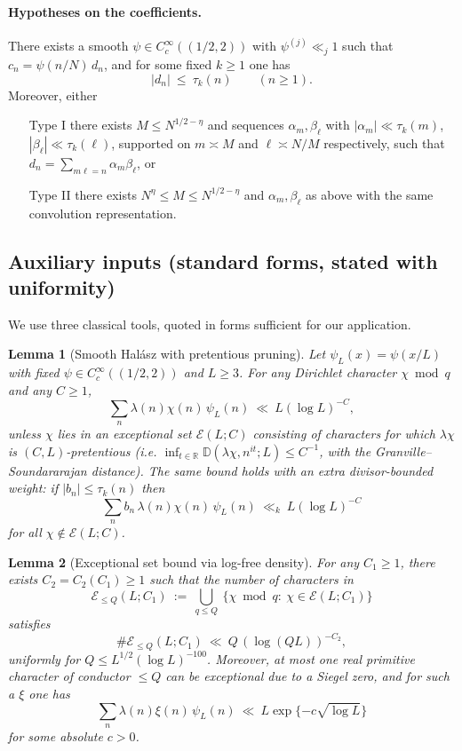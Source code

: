 \documentclass[11pt]{article}
\newtheorem{lemma}{Lemma}[section]
\theoremstyle{definition}
\theoremstyle{remark}
\begin{document}
\paragraph{Hypotheses on the coefficients.}
There exists a smooth $\psi\in C_c^\infty((1/2,2))$ with $\psi^{(j)}\ll_j 1$ such that $c_n=\psi(n/N)\,d_n$, and for some fixed $k\ge 1$ one has
\[
|d_n|\ \le\ \tau_k(n)\qquad (n\ge 1).
\]
Moreover, either
\begin{itemize}[leftmargin=2em]
\item[\textup{Type I}] there exists $M\le N^{1/2-\eta}$ and sequences $\alpha_m,\beta_\ell$ with $|\alpha_m|\ll\tau_k(m)$, $|\beta_\ell|\ll\tau_k(\ell)$, supported on $m\asymp M$ and $\ell\asymp N/M$ respectively, such that $d_n=\sum_{m\ell=n}\alpha_m\beta_\ell$, or
\item[\textup{Type II}] there exists $N^{\eta}\le M\le N^{1/2-\eta}$ and $\alpha_m,\beta_\ell$ as above with the same convolution representation.
\end{itemize}

\subsection*{Auxiliary inputs (standard forms, stated with uniformity)}
We use three classical tools, quoted in forms sufficient for our application.

\begin{lemma}[Smooth Halász with pretentious pruning]\label{lem:halasz}
Let $\psi_L(x)=\psi(x/L)$ with fixed $\psi\in C_c^\infty((1/2,2))$ and $L\ge 3$. For any Dirichlet character $\chi\bmod q$ and any $C\ge 1$,
\[
\sum_{n}\lambda(n)\chi(n)\,\psi_L(n)\ \ll\ L(\log L)^{-C},
\]
\emph{unless} $\chi$ lies in an exceptional set $\mathcal E(L;C)$ consisting of characters for which $\lambda\chi$ is $(C,\!L)$-pretentious (i.e. $\inf_{t\in\mathbb R}\mathbb D(\lambda\chi,n^{it};L)\le C^{-1}$, with the Granville–Soundararajan distance). The same bound holds with an extra divisor-bounded weight: if $|b_n|\le \tau_k(n)$ then
\[
\sum_{n} b_n\,\lambda(n)\chi(n)\,\psi_L(n)\ \ll_{k}\ L(\log L)^{-C}
\]
for all $\chi\notin\mathcal E(L;C)$.
\end{lemma}

\begin{lemma}[Exceptional set bound via log-free density]\label{lem:density}
For any $C_1\ge 1$, there exists $C_2=C_2(C_1)\ge 1$ such that the number of characters in
\[
\mathcal E_{\le Q}(L;C_1)\ :=\ \bigcup_{q\le Q}\ \{\chi\bmod q:\ \chi\in\mathcal E(L;C_1)\}
\]
satisfies
\[
\#\mathcal E_{\le Q}(L;C_1)\ \ll\ Q\,(\log (QL))^{-C_2},
\]
uniformly for $Q\le L^{1/2}(\log L)^{-100}$.
Moreover, at most one real primitive character of conductor $\le Q$ can be exceptional due to a Siegel zero, and for such a $\xi$ one has
\[
\sum_{n}\lambda(n)\xi(n)\,\psi_L(n)\ \ll\ L\exp\!\{-c\sqrt{\log L}\}
\]
for some absolute $c>0$.
\end{lemma}
\end{document}
